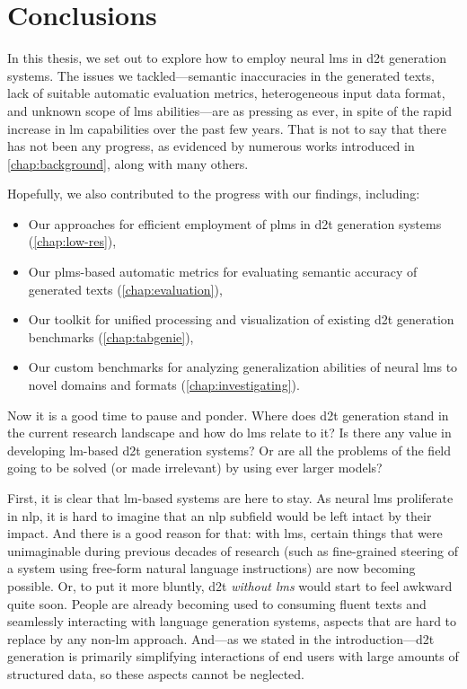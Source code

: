 
\chapter{Conclusions}
\label{chap:conclusions}

In this thesis, we set out to explore how to employ neural \acp{lm} in \ac{d2t} generation systems. The issues we tackled---semantic inaccuracies in the generated texts, lack of suitable automatic evaluation metrics, heterogeneous input data format, and unknown scope of \acp{lm} abilities---are as pressing as ever, in spite of the rapid increase in \ac{lm} capabilities over the past few years. That is not to say that there has not been any progress, as evidenced by numerous works introduced in \autoref{chap:background}, along with many others.


Hopefully, we also contributed to the progress with our findings, including:
\begin{itemize}
    \item Our approaches for efficient employment of \acp{plm} in \ac{d2t} generation systems (\autoref{chap:low-res}),
    \item Our \acp{plm}-based automatic metrics for evaluating semantic accuracy of generated texts (\autoref{chap:evaluation}),
    \item Our toolkit for unified processing and visualization of existing \ac{d2t} generation benchmarks (\autoref{chap:tabgenie}),
    \item Our custom benchmarks for analyzing generalization abilities of neural \acp{lm} to novel domains and formats (\autoref{chap:investigating}).
\end{itemize}

Now it is a good time to pause and ponder. Where does \ac{d2t} generation stand in the current research landscape and how do \acp{lm} relate to it? Is there any value in developing \ac{lm}-based \ac{d2t} generation systems? Or are all the problems of the field going to be solved (or made irrelevant) by using ever larger models?


First, it is clear that \ac{lm}-based systems are here to stay. As neural \acp{lm} proliferate in \ac{nlp}, it is hard to imagine that an \ac{nlp} subfield would be left intact by their impact. And there is a good reason for that: with \acp{lm}, certain things that were unimaginable during previous decades of research (such as fine-grained steering of a system using free-form natural language instructions) are now becoming possible. Or, to put it more bluntly, \ac{d2t} \emph{without \acp{lm}} would start to feel awkward quite soon. People are already becoming used to consuming fluent texts and seamlessly interacting with language generation systems, aspects that are hard to replace by any non-\ac{lm} approach. And---as we stated in the introduction---\ac{d2t} generation is primarily simplifying interactions of end users with large amounts of structured data, so these aspects cannot be neglected.

